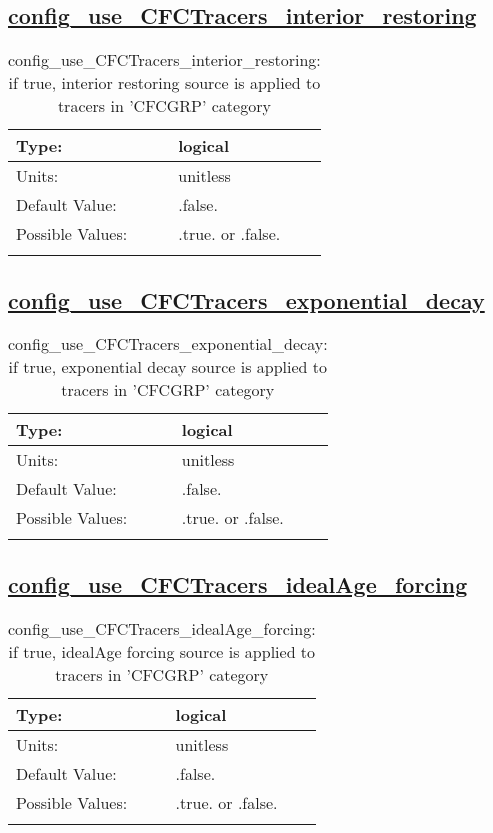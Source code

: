 \subsection[config\_use\_CFCTracers\_interior\_restoring]{\hyperref[sec:nm_tab_tracer_forcing_CFCTracers]{config\_use\_CFCTracers\_interior\_restoring}}
\label{subsec:nm_sec_config_use_CFCTracers_interior_restoring}
\begin{center}
\begin{longtable}{| p{2.0in} || p{4.0in} |}
    \hline
    Type: & logical \\
    \hline
    Units: & \si{unitless} \\
    \hline
    Default Value: & .false. \\
    \hline
    Possible Values: & .true. or .false. \\
    \hline
    \caption{config\_use\_CFCTracers\_interior\_restoring: if true, interior restoring source is applied to tracers in 'CFCGRP' category}
\end{longtable}
\end{center}
\subsection[config\_use\_CFCTracers\_exponential\_decay]{\hyperref[sec:nm_tab_tracer_forcing_CFCTracers]{config\_use\_CFCTracers\_exponential\_decay}}
\label{subsec:nm_sec_config_use_CFCTracers_exponential_decay}
\begin{center}
\begin{longtable}{| p{2.0in} || p{4.0in} |}
    \hline
    Type: & logical \\
    \hline
    Units: & \si{unitless} \\
    \hline
    Default Value: & .false. \\
    \hline
    Possible Values: & .true. or .false. \\
    \hline
    \caption{config\_use\_CFCTracers\_exponential\_decay: if true, exponential decay source is applied to tracers in 'CFCGRP' category}
\end{longtable}
\end{center}
\subsection[config\_use\_CFCTracers\_idealAge\_forcing]{\hyperref[sec:nm_tab_tracer_forcing_CFCTracers]{config\_use\_CFCTracers\_idealAge\_forcing}}
\label{subsec:nm_sec_config_use_CFCTracers_idealAge_forcing}
\begin{center}
\begin{longtable}{| p{2.0in} || p{4.0in} |}
    \hline
    Type: & logical \\
    \hline
    Units: & \si{unitless} \\
    \hline
    Default Value: & .false. \\
    \hline
    Possible Values: & .true. or .false. \\
    \hline
    \caption{config\_use\_CFCTracers\_idealAge\_forcing: if true, idealAge forcing source is applied to tracers in 'CFCGRP' category}
\end{longtable}
\end{center}

